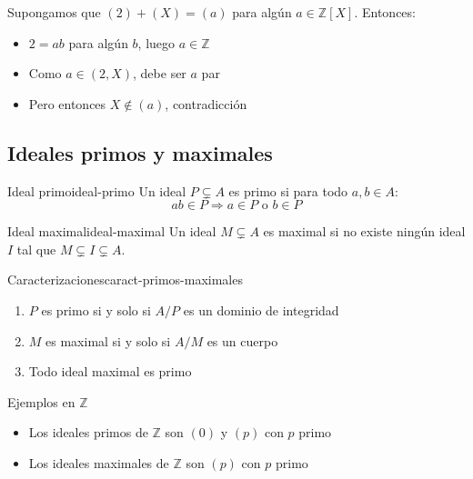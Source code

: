 \begin{proofbox}
    Supongamos que \((2) + (X) = (a)\) para algún \(a \in \mathbb{Z}[X]\). Entonces:
    \begin{itemize}
        \item \(2 = ab\) para algún \(b\), luego \(a \in \mathbb{Z}\)
        \item Como \(a \in (2, X)\), debe ser \(a\) par
        \item Pero entonces \(X \notin (a)\), contradicción
    \end{itemize}
\end{proofbox}

\subsection{Ideales primos y maximales}

\begin{definition}{Ideal primo}{ideal-primo}
    Un ideal \(P \subsetneq A\) es {primo} si para todo \(a, b \in A\):
    \[
    ab \in P \Rightarrow a \in P \text{ o } b \in P
    \]
\end{definition}

\begin{definition}{Ideal maximal}{ideal-maximal}
    Un ideal \(M \subsetneq A\) es {maximal} si no existe ningún ideal \(I\) tal que \(M \subsetneq I \subsetneq A\).
\end{definition}

\begin{lemma}{Caracterizaciones}{caract-primos-maximales}
    \begin{enumerate}
        \item \(P\) es primo si y solo si \(A/P\) es un dominio de integridad
        \item \(M\) es maximal si y solo si \(A/M\) es un cuerpo
        \item Todo ideal maximal es primo
    \end{enumerate}
\end{lemma}

\begin{example}{Ejemplos en \(\mathbb{Z}\)}{}
    \begin{itemize}
        \item Los ideales primos de \(\mathbb{Z}\) son \((0)\) y \((p)\) con \(p\) primo
        \item Los ideales maximales de \(\mathbb{Z}\) son \((p)\) con \(p\) primo
    \end{itemize}
\end{example}

